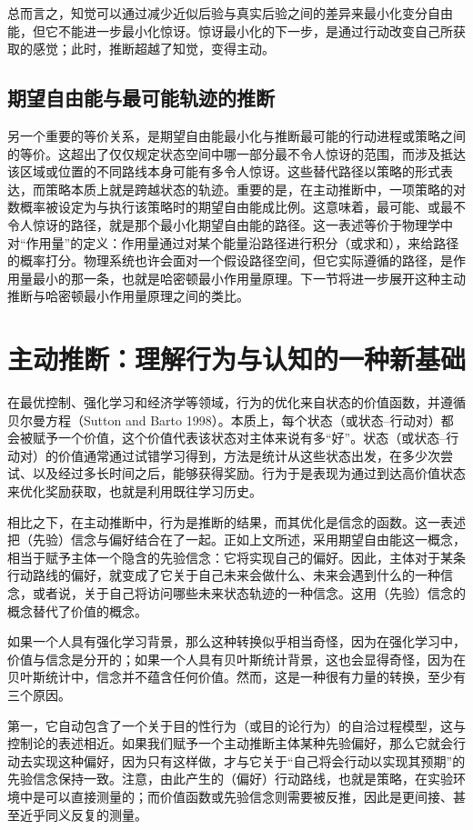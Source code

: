 总而言之，知觉可以通过减少近似后验与真实后验之间的差异来最小化变分自由能，但它不能进一步最小化惊讶。惊讶最小化的下一步，是通过行动改变自己所获取的感觉；此时，推断超越了知觉，变得主动。

\subsection{期望自由能与最可能轨迹的推断}

另一个重要的等价关系，是期望自由能最小化与推断最可能的行动进程或策略之间的等价。这超出了仅仅规定状态空间中哪一部分最不令人惊讶的范围，而涉及抵达该区域或位置的不同路线本身可能有多令人惊讶。这些替代路径以策略的形式表达，而策略本质上就是跨越状态的轨迹。重要的是，在主动推断中，一项策略的对数概率被设定为与执行该策略时的期望自由能成比例。这意味着，最可能、或最不令人惊讶的路径，就是那个最小化期望自由能的路径。这一表述等价于物理学中对“作用量”的定义：作用量通过对某个能量沿路径进行积分（或求和），来给路径的概率打分。物理系统也许会面对一个假设路径空间，但它实际遵循的路径，是作用量最小的那一条，也就是哈密顿最小作用量原理。下一节将进一步展开这种主动推断与哈密顿最小作用量原理之间的类比。

\section{主动推断：理解行为与认知的一种新基础}

在最优控制、强化学习和经济学等领域，行为的优化来自状态的价值函数，并遵循贝尔曼方程（Sutton and Barto 1998）。本质上，每个状态（或状态--行动对）都会被赋予一个价值，这个价值代表该状态对主体来说有多“好”。状态（或状态--行动对）的价值通常通过试错学习得到，方法是统计从这些状态出发，在多少次尝试、以及经过多长时间之后，能够获得奖励。行为于是表现为通过到达高价值状态来优化奖励获取，也就是利用既往学习历史。

相比之下，在主动推断中，行为是推断的结果，而其优化是信念的函数。这一表述把（先验）信念与偏好结合在了一起。正如上文所述，采用期望自由能这一概念，相当于赋予主体一个隐含的先验信念：它将实现自己的偏好。因此，主体对于某条行动路线的偏好，就变成了它关于自己未来会做什么、未来会遇到什么的一种信念，或者说，关于自己将访问哪些未来状态轨迹的一种信念。这用（先验）信念的概念替代了价值的概念。

如果一个人具有强化学习背景，那么这种转换似乎相当奇怪，因为在强化学习中，价值与信念是分开的；如果一个人具有贝叶斯统计背景，这也会显得奇怪，因为在贝叶斯统计中，信念并不蕴含任何价值。然而，这是一种很有力量的转换，至少有三个原因。

第一，它自动包含了一个关于目的性行为（或目的论行为）的自洽过程模型，这与控制论的表述相近。如果我们赋予一个主动推断主体某种先验偏好，那么它就会行动去实现这种偏好，因为只有这样做，才与它关于“自己将会行动以实现其预期”的先验信念保持一致。注意，由此产生的（偏好）行动路线，也就是策略，在实验环境中是可以直接测量的；而价值函数或先验信念则需要被反推，因此是更间接、甚至近乎同义反复的测量。

